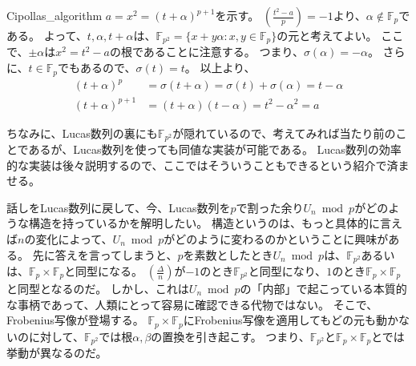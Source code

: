 \begin{prProof}{Cipollas_algorithm}
$a=x^2=(t+\alpha)^{p+1}$を示す。
$\left(\frac{t^2-a}{p}\right)=-1$より、$\alpha\not\in\mathbb{F}_p$である。
よって、$t,\alpha,t+\alpha$は、$\mathbb{F}_{p^2}=\{x+y\alpha : x,y \in\mathbb{F}_p\}$の元と考えてよい。
ここで、$\pm\alpha$は$x^2=t^2-a$の根であることに注意する。
つまり、$\sigma(\alpha)=-\alpha$。
さらに、$t\in\mathbb{F}_p$でもあるので、$\sigma(t)=t$。
以上より、
\begin{align*}
(t+\alpha)^p &= \sigma(t + \alpha) = \sigma(t) + \sigma(\alpha) = t - \alpha\\
(t+\alpha)^{p+1} &= (t+\alpha)(t-\alpha) = t^2 - \alpha^2 = a
\end{align*}
\end{prProof}

ちなみに、Lucas数列の裏にも$\mathbb{F}_{p^2}$が隠れているので、考えてみれば当たり前のことであるが、Lucas数列を使っても同値な実装が可能である。
Lucas数列の効率的な実装は後々説明するので、ここではそういうこともできるという紹介で済ませる。


話しをLucas数列に戻して、今、Lucas数列を$p$で割った余り$U_n \bmod{p}$がどのような構造を持っているかを解明したい。
構造というのは、もっと具体的に言えば$n$の変化によって、$U_n \bmod{p}$がどのように変わるのかということに興味がある。
先に答えを言ってしまうと、$p$を素数としたとき$U_n \bmod{p}$は、$\mathbb{F}_{p^2}$あるいは、$\mathbb{F}_p\times\mathbb{F}_p$と同型になる。
$\left(\frac{\Delta}{n}\right)$が$-1$のとき$\mathbb{F}_{p^2}$と同型になり、$1$のとき$\mathbb{F}_p\times\mathbb{F}_p$と同型となるのだ。
しかし、これは$U_n \bmod{p}$の「内部」で起こっている本質的な事柄であって、人類にとって容易に確認できる代物ではない。
そこで、Frobenius写像が登場する。
$\mathbb{F}_p\times\mathbb{F}_p$にFrobenius写像を適用してもどの元も動かないのに対して、$\mathbb{F}_{p^2}$では根$\alpha,\beta$の置換を引き起こす。
つまり、$\mathbb{F}_{p^2}$と$\mathbb{F}_p\times\mathbb{F}_p$とでは挙動が異なるのだ。

